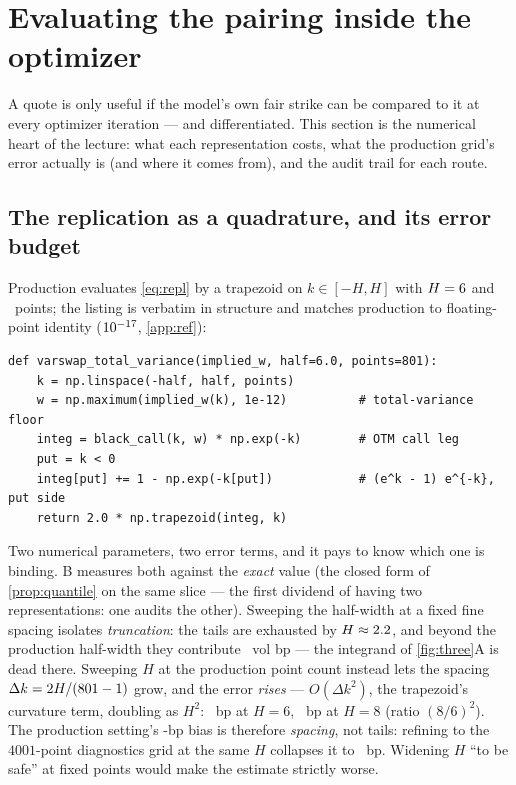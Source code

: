 \documentclass[11pt]{article}
\begin{document}
\section{Evaluating the pairing inside the optimizer}
\label{sec:loop}

A quote is only useful if the model's own fair strike can be compared to
it at every optimizer iteration --- and differentiated.  This section is
the numerical heart of the lecture: what each representation costs, what
the production grid's error actually is (and where it comes from), and
the audit trail for each route.

\subsection{The replication as a quadrature, and its error budget}
\label{sec:budget}

Production evaluates \eqref{eq:repl} by a trapezoid on
$k\in[-H,H]$ with $H=6$ and \vsrpoints\ points; the listing
is verbatim in structure and matches production to floating-point
identity ($10^{-17}$, \cref{app:ref}):

\begin{lstlisting}[caption={The strike-side quadrature of \eqref{eq:repl}
(distilled from \texttt{calib/varswap.py}; verified identical to
production).},label={lst:repl}]
def varswap_total_variance(implied_w, half=6.0, points=801):
    k = np.linspace(-half, half, points)
    w = np.maximum(implied_w(k), 1e-12)          # total-variance floor
    integ = black_call(k, w) * np.exp(-k)        # OTM call leg
    put = k < 0
    integ[put] += 1 - np.exp(-k[put])            # (e^k - 1) e^{-k}, put side
    return 2.0 * np.trapezoid(integ, k)
\end{lstlisting}

Two numerical parameters, two error terms, and it pays to know which one
is binding.  B measures both against the \emph{exact}
value (the closed form of \cref{prop:quantile} on the same slice --- the
first dividend of having two representations: one audits the other).
Sweeping the half-width at a fixed fine spacing isolates
\emph{truncation}: the tails are exhausted by $H\approx2.2$,
and beyond the production half-width they contribute \vsrtruncsixbp\ vol
bp --- the integrand of \cref{fig:three}A is dead there.  Sweeping $H$
at the production point count instead lets the spacing
$\Delta k=2H/(\text{801}-1)$ grow, and the error \emph{rises}
--- $O(\Delta k^{2})$, the trapezoid's curvature term, doubling as
$H^{2}$: \vsragreebp\ bp at $H=6$, \vsrprodeightbp\ bp at $H=8$ (ratio
$(8/6)^2$).  The production setting's \vsragreebp-bp bias is therefore
\emph{spacing}, not tails: refining to the $4001$-point diagnostics grid
at the same $H$ collapses it to \vsrreplfinebp\ bp.  Widening $H$
``to be safe'' at fixed points would make the estimate strictly worse.
\end{document}
